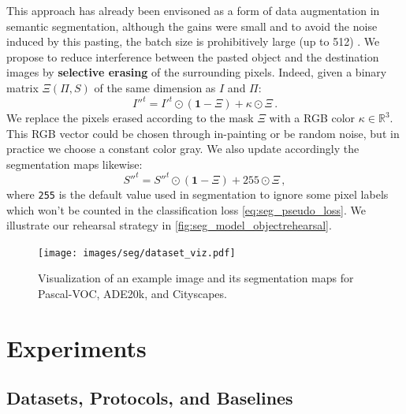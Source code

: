 This approach has already been envisoned as a form of data augmentation in semantic segmentation,
although the gains were small and to avoid the noise induced by this pasting, the batch size is
prohibitively large (up to 512) \citep{ghiasi2020simplecopypaste}. We propose to reduce interference
between the pasted object and the destination images by \textbf{selective erasing} of the
surrounding pixels. Indeed, given a binary matrix $\Xi(\Pi, S)$ of the same dimension as $I$ and
$\Pi$:
%
\begin{equation}
    {I''}^t = {I'}^t \odot (\mathbf{1} - \Xi) + \kappa \odot \Xi\,.
    \label{eq:seg_erasing_pixel}
\end{equation}
%
We replace the pixels erased according to the mask $\Xi$ with a RGB color $\kappa \in \mathbb{R}^3$.
This RGB vector could be chosen through in-painting \citep{fang2019instaboost} or be random noise,
but in practice we choose a constant color gray. We also update accordingly the segmentation maps
likewise:
%
\begin{equation}
    {S''}^t = {S''}^t \odot (\mathbf{1} - \Xi) + 255 \odot \Xi\,,
    \label{eq:seg_erasing_label}
\end{equation}
%
where \texttt{255} is the default value used in segmentation to ignore some pixel labels which won't
be counted in the classification loss \autoref{eq:seg_pseudo_loss}. We illustrate our rehearsal
strategy in \autoref{fig:seg_model_objectrehearsal}.



\begin{figure}
    \centering
    \texttt{[image: images/seg/dataset\_viz.pdf]}
    \vspace*{-0.3cm}
    \caption{Visualization of an example image and its segmentation maps for Pascal-VOC, ADE20k, and Cityscapes.}
    \label{fig:seg_dataset_viz}
\end{figure}



\section{Experiments}
\label{sec:seg_exp}

\subsection{Datasets, Protocols, and Baselines}
\label{sec:seg_datasets_protocols}

